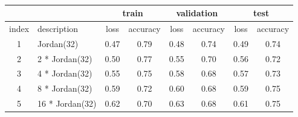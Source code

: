 \documentclass[12pt, a4paper]{article}
\begin{document}
\begin{latin}
\begin{table}[!ht]
    \centering
    \caption{}
    \label{analysing_impact_of_number_of_subnetwork_jordan}
    \begin{tabular}{c|p{3cm}|c|c|c|c|c|c}
        & & \multicolumn{2}{c|}{\cellcolor{teal!30}train} & \multicolumn{2}{c|}{\cellcolor{teal!30}validation} &  \multicolumn{2}{c}{\cellcolor{teal!30}test} \\ \hline
        index & description & loss & accuracy & loss & accuracy & loss & accuracy\\ \hline
        1 & Jordan(32) & 0.47 & 0.79 & 0.48 & 0.74 & 0.49 & 0.74 \\
        2 & 2 * Jordan(32) & 0.50 & 0.77 & 0.55 & 0.70 & 0.56 & 0.72 \\ \hline
        3 & 4 * Jordan(32) & 0.55 & 0.75 & 0.58 & 0.68 & 0.57 & 0.73 \\ \hline
        4 & 8 * Jordan(32) & 0.59 & 0.72 & 0.60 & 0.68 & 0.59 & 0.75 \\ \hline
        5 & 16 * Jordan(32) & 0.62 & 0.70 & 0.63 & 0.68 & 0.61 & 0.75 \\ \hline
     \end{tabular}
\end{table}
\end{latin}
\end{document}
